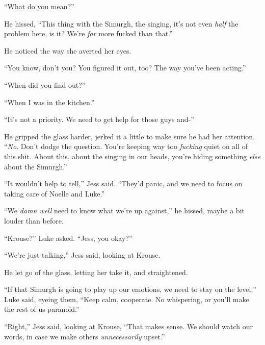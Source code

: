 ``What do you mean?''



He hissed, ``This thing with the Simurgh, the singing, it's not even \emph{half} the problem here, is it?  We're \emph{far} more fucked than that.''



He noticed the way she averted her eyes.



``You know, don't you?  You figured it out, too?  The way you've been acting.''



``When did you find out?''



``When I was in the kitchen.''



``It's not a priority.  We need to get help for those guys and-''



He gripped the glass harder, jerked it a little to make sure he had her attention.  ``\emph{No}.  Don't dodge the question.  You're keeping way too \emph{fucking} quiet on all of this shit.  About this, about the singing in our heads, you're hiding something \emph{else} about the Simurgh.''



``It wouldn't help to tell,'' Jess said.  ``They'd panic, and we need to focus on taking care of Noelle and Luke.''



``We \emph{damn well} need to know what we're up against,'' he hissed, maybe a bit louder than before.



``Krouse?'' Luke asked.  ``Jess, you okay?''



``We're just talking,'' Jess said, looking at Krouse.



He let go of the glass, letting her take it, and straightened.



``If that Simurgh is going to play up our emotions, we need to stay on the level,'' Luke said, eyeing them,  ``Keep calm, cooperate.  No whispering, or you'll make the rest of us paranoid.''



``Right,'' Jess said, looking at Krouse, ``That makes sense.  We should watch our words, in case we make others \emph{unnecessarily} upset.''



